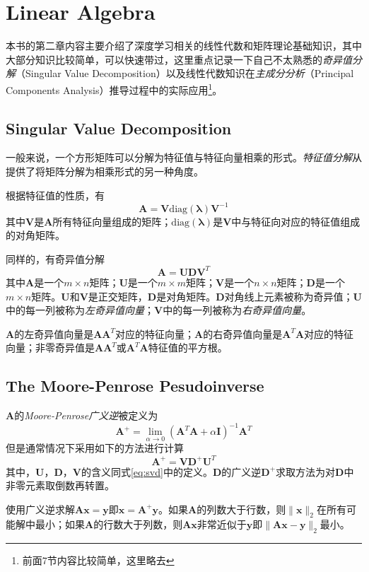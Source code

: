 \chapter{Linear Algebra}

本书的第二章内容主要介绍了深度学习相关的线性代数和矩阵理论基础知识，其中大部分知识比较简单，可以快速带过，这里重点记录一下自己不太熟悉的\textit{奇异值分解}（Singular Value Decomposition）以及线性代数知识在\textit{主成分分析}（Principal Components Analysis）推导过程中的实际应用\footnote{前面7节内容比较简单，这里略去}。

\setcounter{section}{7}
\section{Singular Value Decomposition}

一般来说，一个方形矩阵可以分解为特征值与特征向量相乘的形式。\textit{特征值分解}从提供了将矩阵分解为相乘形式的另一种角度。

根据特征值的性质，有
\begin{equation}
\mathbf A = \mathbf V\text{diag}(\mathbf\lambda)\mathbf V^{-1}
\end{equation}
其中$\mathbf V$是$\mathbf A$所有特征向量组成的矩阵；$\text{diag}(\mathbf\lambda)$是$\mathbf V$中与特征向对应的特征值组成的对角矩阵。

同样的，有奇异值分解
\begin{equation}\label{eq:svd}
\mathbf A=\mathbf{UDV}^{T}
\end{equation}
其中$\mathbf A$是一个$m\times n$矩阵；$\mathbf U$是一个$m\times m$矩阵；$\mathbf V$是一个$n\times n$矩阵；$\mathbf D$是一个$m\times n$矩阵。$\mathbf U$和$\mathbf V$是正交矩阵，$\mathbf D$是对角矩阵。$\mathbf D$对角线上元素被称为奇异值；$\mathbf U$中的每一列被称为\textit{左奇异值向量}；$\mathbf V$中的每一列被称为\textit{右奇异值向量}。

$\mathbf A$的左奇异值向量是$\mathbf {AA}^T$对应的特征向量；$\mathbf A$的右奇异值向量是$\mathbf{A}^T\mathbf A$对应的特征向量；非零奇异值是$\mathbf {AA}^T$或$\mathbf{A}^T\mathbf A$特征值的平方根。

\section{The Moore-Penrose Pesudoinverse}

$\mathbf A$的\textit{Moore-Penrose广义逆}被定义为
\begin{equation}
\mathbf A^+=\lim_{\alpha\to 0}(\mathbf{A}^T\mathbf A+\alpha\mathbf I)^{-1}\mathbf A^T
\end{equation}
但是通常情况下采用如下的方法进行计算
\begin{equation}
\mathbf A^+=\mathbf{VD}^+\mathbf U^T
\end{equation}
其中，$\mathbf{U}$，$\mathbf{D}$，$\mathbf{V}$的含义同式\ref{eq:svd}中的定义。$\mathbf D$的广义逆$\mathbf D^+$求取方法为对$\mathbf D$中非零元素取倒数再转置。

使用广义逆求解$\mathbf {Ax=y}$即$\mathbf{x=A^+y}$。如果$\mathbf A$的列数大于行数，则$\|\mathbf x\|_2$在所有可能解中最小；如果$\mathbf A$的行数大于列数，则$\mathbf{Ax}$非常近似于$\mathbf y$即$\|\mathbf{Ax-y}\|_2$最小。